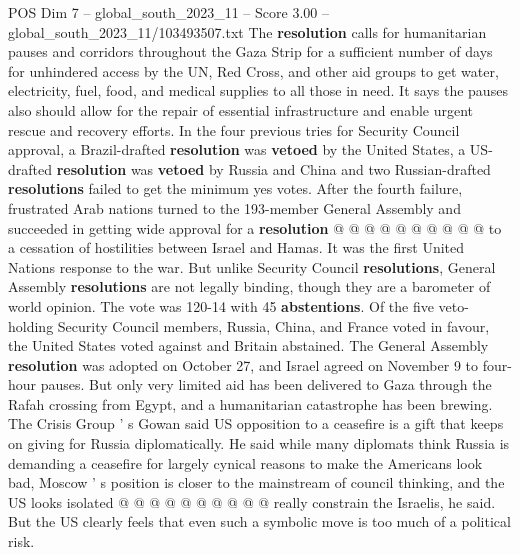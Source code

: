 \begin{textsample}{POS Dim 7 – global\_south\_2023\_11 – Score 3.00 – global\_south\_2023\_11/103493507.txt}
The \textbf{resolution} calls for humanitarian pauses and corridors throughout the Gaza Strip for a sufficient number of days for unhindered access by the UN, Red Cross, and other aid groups to get water, electricity, fuel, food, and medical supplies to all those in need.
It says the pauses also should allow for the repair of essential infrastructure and enable urgent rescue and recovery efforts.
In the four previous tries for Security Council approval, a Brazil-drafted \textbf{resolution} was \textbf{vetoed} by the United States, a US-drafted \textbf{resolution} was \textbf{vetoed} by Russia and China and two Russian-drafted \textbf{resolutions} failed to get the minimum yes votes.
After the fourth failure, frustrated Arab nations turned to the 193-member General Assembly and succeeded in getting wide approval for a \textbf{resolution} @ @ @ @ @ @ @ @ @ @ to a cessation of hostilities between Israel and Hamas.
It was the first United Nations response to the war.
But unlike Security Council \textbf{resolutions}, General Assembly \textbf{resolutions} are not legally binding, though they are a barometer of world opinion.
The vote was 120-14 with 45 \textbf{abstentions}.
Of the five veto-holding Security Council members, Russia, China, and France voted in favour, the United States voted against and Britain abstained.
The General Assembly \textbf{resolution} was adopted on October 27, and Israel agreed on November 9 to four-hour pauses.
But only very limited aid has been delivered to Gaza through the Rafah crossing from Egypt, and a humanitarian catastrophe has been brewing.
The Crisis Group ' s Gowan said US opposition to a ceasefire is a gift that keeps on giving for Russia diplomatically.
He said while many diplomats think Russia is demanding a ceasefire for largely cynical reasons to make the Americans look bad, Moscow ' s position is closer to the mainstream of council thinking, and the US looks isolated @ @ @ @ @ @ @ @ @ @ really constrain the Israelis, he said.
But the US clearly feels that even such a symbolic move is too much of a political risk.

\end{textsample}
